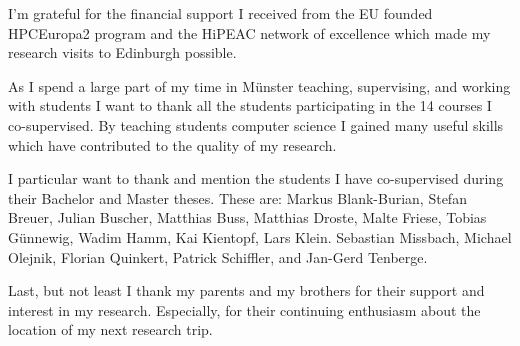 I'm grateful for the financial support I received from the EU founded HPCEuropa2 program and the HiPEAC network of excellence which made my research visits to Edinburgh possible.

As I spend a large part of my time in M{\"u}nster teaching, supervising, and working with students I want to thank all the students participating in the 14 courses I co-supervised.
By teaching students computer science I gained many useful skills which have contributed to the quality of my research.

I particular want to thank and mention the students I have co-supervised during their Bachelor and Master theses.
These are:
Markus Blank-Burian,
Stefan Breuer,
Julian Buscher,
Matthias Buss,
Matthias Droste,
Malte Friese,
Tobias G{\"u}nnewig,
Wadim Hamm,
Kai Kientopf,
Lars Klein.
Sebastian Missbach,
Michael Olejnik,
Florian Quinkert,
Patrick Schiffler,
and
Jan-Gerd Tenberge.

Last, but not least I thank my parents and my brothers for their support and interest in my research.
Especially, for their continuing enthusiasm about the location of my next research trip.


\endgroup
